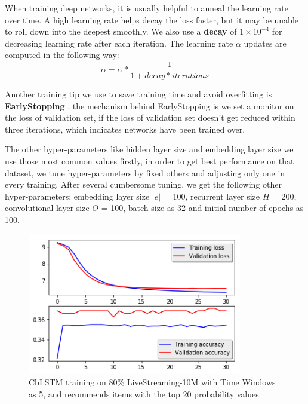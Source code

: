 \documentclass[runningheads]{llncs}
\begin{document}
When training deep networks, it is usually helpful to anneal the learning rate over time. A high learning rate helps decay the loss faster, but it may be unable to roll down into the deepest smoothly. We also use a \textbf{decay} \cite{22} of $1\times 10^{-4}$ for decreasing learning rate after each iteration. The learning rate $\alpha$ updates are computed in the following way:
\begin{equation}
\alpha = \alpha * \frac{1}{1 + decay * iterations}
\end{equation}

Another training tip we use to save training time and avoid overfitting is \textbf{EarlyStopping} \cite{22}, the mechanism behind EarlyStopping is we set a monitor on the loss of validation set, if the loss of validation set doesn't get reduced within three iterations, which indicates networks have been trained over.

The other hyper-parameters like hidden layer size and embedding layer size we use those most common values firstly,
in order to get best performance on that dataset, we tune hyper-parameters by fixed others and adjusting only one in every training. After several cumbersome tuning, we get the following other hyper-parameters: embedding layer size $|e|$ = 100, recurrent layer size $H$ = 200, convolutional layer size $O$ = 100, batch size as 32 and initial number of epochs as 100.
\begin{figure}[htbp]
\centerline
{\includegraphics[height=6.2cm]{image/10thousand@6.png}}
\caption{CbLSTM training on 80\% LiveStreaming-10M with Time Windows as 5, and recommends items with the top 20 probability values}
\label{fig}
\end{figure}
\end{document}
